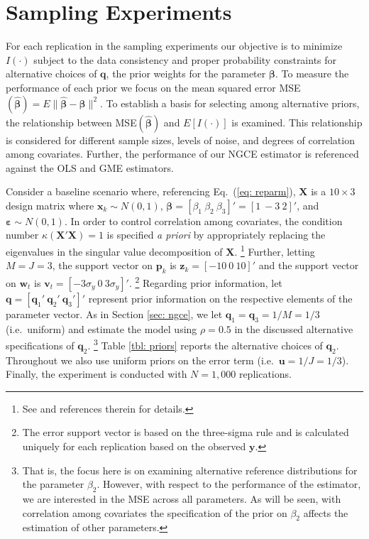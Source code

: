 \documentclass[english]{article}
\begin{document}
\section{Sampling Experiments}
\label{sec: mce}

For each replication in the sampling experiments our objective is to minimize 
$I(\cdot)$ subject to the data consistency and proper probability constraints 
for alternative choices of $\mathbf{q}$, the prior weights for the parameter 
$\mathbf{\beta}$. 
To measure the performance of each prior we focus on the mean squared 
error MSE$(\hat{\mathbf{\beta}}) = E \| \hat{\mathbf{\beta}}- 
\mathbf{\beta}\|^2$.
To establish a basis for selecting among alternative priors, the relationship 
between MSE$(\hat{\mathbf{\beta}})$ and $E[I(\cdot)]$ is examined.
This relationship is considered for different sample sizes, levels of noise, 
and degrees of correlation among covariates.
Further, the performance of our NGCE estimator is referenced 
against the OLS and GME estimators.

Consider a baseline scenario where, referencing Eq.\ (\ref{eq: reparm}),
$\mathbf{X}$ is a $10 \times 3$ design matrix where $\mathbf{x}_k \sim 
N(0,1)$, $\mathbf{\beta}= [\beta_1 ~ \beta_2 ~ \beta_3]'=[1 ~ -3 ~ 2]'$, 
and $\mathbf{\varepsilon} \sim N(0,1)$.
In order to control correlation among covariates, the condition
number $\kappa(\mathbf{X}'\mathbf{X})=1$ is specified \textit{a priori}
by appropriately replacing the eigenvalues in the singular value 
decomposition of $\mathbf{X}$.%
\footnote{See \citet[pg.\ 133]{golan1996} and references therein for 
details.}
Further, letting $M=J=3$, the support vector on $\mathbf{p}_k$ is 
$\mathbf{z}_k = [- 10 ~ 0 ~ 10]'$ and the support vector on $\mathbf{w}_t$ 
is $\mathbf{v}_t = [- 3\sigma_y ~ 0 ~ 3\sigma_y]'$.%
\footnote{The error support vector is based on the three-sigma
rule \citep{pukelsheim1994} and is calculated 
uniquely for each replication based on the observed $\mathbf{y}$.}
Regarding prior information, let $\mathbf{q} = [\mathbf{q}_1' ~ 
\mathbf{q}_2' ~ \mathbf{q}_3']'$ represent prior information on the 
respective elements of the parameter vector.
As in Section \ref{sec: ngce}, we let $\mathbf{q}_1 = \mathbf{q}_3 = 1/M 
= 1/3$ (i.e.\ uniform) and estimate the model using $\rho=0.5$  in the 
discussed alternative specifications of $\mathbf{q}_2$.%
\footnote{That is, the focus here is on examining alternative reference 
distributions for the parameter $\beta_2$. 
However, with respect to the performance of the estimator, we are 
interested in the MSE across all parameters.
As will be seen, with correlation among covariates the specification of the 
prior on $\beta_2$ affects the estimation of other parameters.}
Table \ref{tbl: priors} reports the alternative choices of $\mathbf{q}_2$.
Throughout we also use uniform priors on the error term 
(i.e.\ $\mathbf{u} = 1/J = 1/3$).
Finally, the experiment is conducted with $N=1,000$ replications.
\end{document}
